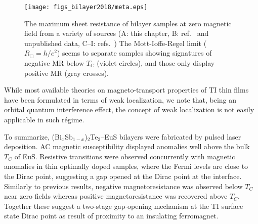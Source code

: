 %
\begin{figure}[ht]%
    \centering
    \texttt{[image: figs\_bilayer2018/meta.eps]}
    \caption[Sheet resistance and signatures of negative magnetoresistance in TI-ferromagnet bilayers in literature]{\label{fig:bilayer2018_wl_trend} The maximum sheet resistance of bilayer samples at zero magnetic field from a variety of sources (A: this chapter, B: ref.~\protect\cite{bilayer2014} and unpublished data, C--I: refs.~\protect\cite{Samarth2017, Shi2014, Petta2014, Wang2014, Tian2016, Qiu2017}) The Mott-Ioffe-Regel limit ($R_\Box = h/e^2$) seems to separate samples showing signatures of negative MR below $T_C$ (violet circles), and those only display positive MR (gray crosses).}
\end{figure}%
While most available theories on magneto-transport properties of TI thin films have been formulated in terms of weak localization, we note that, being an orbital quantum interference effect, the concept of weak localization is not easily applicable in such r\'egime.

To summarize, (Bi$_x$Sb$_{1-x}$)$_2$Te$_3$--EuS bilayers were fabricated by pulsed laser deposition. AC magnetic susceptibility displayed anomalies well above the bulk $T_C$ of EuS. Resistive transitions were observed concurrently with magnetic anomalies in thin optimally doped samples, where the Fermi levels are close to the Dirac point, suggesting a gap opened at the Dirac point at the interface. Similarly to previous results, negative magnetoresistance was observed below $T_C$ near zero fields whereas positive magnetoresistance was recovered above $T_C$. Together these suggest a two-stage gap-opening mechanism at the TI surface state Dirac point as result of proximity to an insulating ferromagnet.